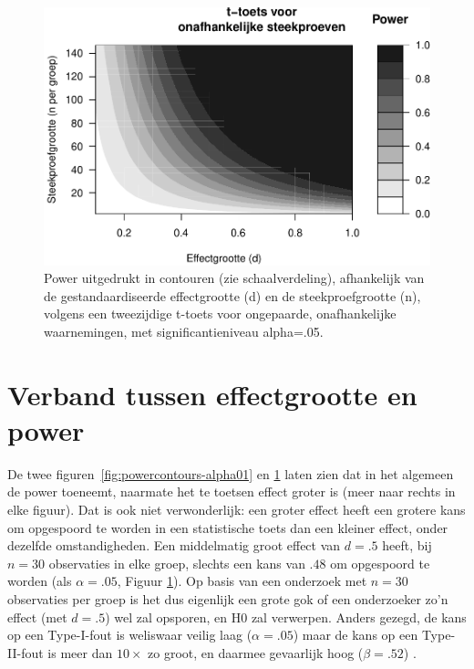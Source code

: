 \documentclass[
]{book}
\begin{document}
\begin{figure}
\centering
\includegraphics{KMS-NL_files/figure-latex/powercontours-alpha05-1.pdf}
\caption{\label{fig:powercontours-alpha05}Power uitgedrukt in contouren (zie schaalverdeling), afhankelijk van de gestandaardiseerde effectgrootte (d) en de steekproefgrootte (n), volgens een tweezijdige t-toets voor ongepaarde, onafhankelijke waarnemingen, met significantieniveau alpha=.05.}
\end{figure}

\hypertarget{sec:effectgrootte-power}{%
\section{Verband tussen effectgrootte en power}\label{sec:effectgrootte-power}}

De twee figuren~\ref{fig:powercontours-alpha01} en
\ref{fig:powercontours-alpha05} laten zien dat in het algemeen de
power toeneemt, naarmate het te toetsen effect groter is (meer naar
rechts in elke figuur). Dat is ook niet verwonderlijk: een groter effect
heeft een grotere kans om opgespoord te worden in een statistische toets
dan een kleiner effect, onder dezelfde omstandigheden. Een middelmatig
groot effect van \(d=.5\) heeft, bij \(n=30\) observaties in elke groep,
slechts een kans van \(.48\) om opgespoord te worden (als \(\alpha=.05\), Figuur \ref{fig:powercontours-alpha05}). Op basis van een
onderzoek met \(n=30\) observaties per groep is het dus eigenlijk een
grote gok of een onderzoeker zo'n effect (met \(d=.5\)) wel zal opsporen,
en H0 zal verwerpen. Anders gezegd, de kans op een Type-I-fout is
weliswaar veilig laag (\(\alpha=.05\)) maar de kans op een Type-II-fout is
meer dan \(10\times\) zo groot, en daarmee gevaarlijk hoog (\(\beta=.52\)) \citep[Ch.12]{Rose08}.
\end{document}
